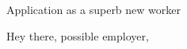 
\opening{		
	\large{Application as a superb new worker} \normalsize 
}

\makelettertitle\justifying

Hey there, possible employer,
